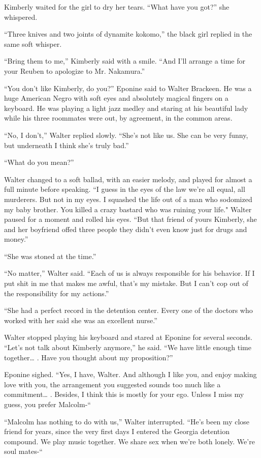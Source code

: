 \documentclass[]{article}
\begin{document}
{Kimberly waited for the girl to dry her tears.  “What have you got?” she whispered.

“Three knives and two joints of dynamite kokomo,” the black girl replied in the same soft whisper.

“Bring them to me,” Kimberly said with a smile.  “And I’ll arrange a time for your Reuben to apologize to Mr.  Nakamura.”

“You don’t like Kimberly, do you?” Eponine said to Walter Brackeen.  He was a huge American Negro with soft eyes and absolutely magical fingers on a keyboard.  He was playing a light jazz medley and staring at his beautiful lady while his three roommates were out, by agreement, in the common areas.

“No, I don’t,” Walter replied slowly.  “She’s not like us.  She can be very funny, but underneath I think she’s truly bad.”

“What do you mean?”

Walter changed to a soft ballad, with an easier melody, and played for almost a full minute before speaking.  “I guess in the eyes of the law we’re all equal, all murderers.  But not in my eyes.  I squashed the life out of a man who sodomized my baby brother.  You killed a crazy bastard who was ruining your life."  Walter paused for a moment and rolled his eyes.  “But that friend of yours Kimberly, she and her boyfriend offed three people they didn’t even know just for drugs and money.”

“She was stoned at the time.”

“No matter,” Walter said.  “Each of us is always responsible for his behavior.  If I put shit in me that makes me awful, that’s my mistake.  But I can’t cop out of the responsibility for my actions.”

“She had a perfect record in the detention center.  Every one of the doctors who worked with her said she was an excellent nurse.”

Walter stopped playing his keyboard and stared at Eponine for several seconds.  “Let’s not talk about Kimberly anymore,” he said.  “We have little enough time together… .  Have you thought about my proposition?”

Eponine sighed.  “Yes, I have, Walter.  And although I like you, and enjoy making love with you, the arrangement you suggested sounds too much like a commitment… .  Besides, I think this is mostly for your ego.  Unless I miss my guess, you prefer Malcolm-“

“Malcolm has nothing to do with us,” Walter interrupted.  “He’s been my close friend for years, since the very first days I entered the Georgia detention compound.  We play music together.  We share sex when we’re both lonely.  We’re soul mates-“

}
\end{document}

